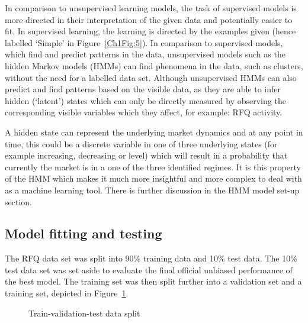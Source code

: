 In comparison to unsupervised learning models, the task of supervised models is more directed in their interpretation of the given data and potentially easier to fit. In supervised learning, the learning is directed by the examples given (hence labelled `Simple' in Figure~\ref{Ch1Fig:5}). In comparison to supervised models, which find and predict patterns in the data, unsupervised models such as the hidden Markov models (HMMs) can find phenomena in the data, such as clusters, without the need for a labelled data set. Although unsupervised HMMs can also predict and find patterns based on the visible data, as they are able to infer hidden (`latent') states which can only be directly measured by observing the corresponding visible variables which they affect, for example: RFQ activity.

A hidden state can represent the underlying market dynamics and at any point in time, this could be a discrete variable in one of three underlying states (for example increasing, decreasing or level) which will result in a probability that currently the market is in a one of the three identified regimes. It is this property of the HMM which makes it much more insightful and more complex to deal with as a machine learning tool. There is further discussion in the HMM model set-up section.

\subsection{Model fitting and testing}\label{Ch1Sec2S4}
The RFQ data set was split into 90\% training data and 10\% test data. The 10\% test data set was set aside to evaluate the final official unbiased performance of the best model. The training set was then split further into a validation set and a training set, depicted in Figure~\ref{Ch1Fig:6}.

 
\begin{figure}[!ht]\centering
    \caption{Train-validation-test data split}\label{Ch1Fig:6}
\end{figure}

